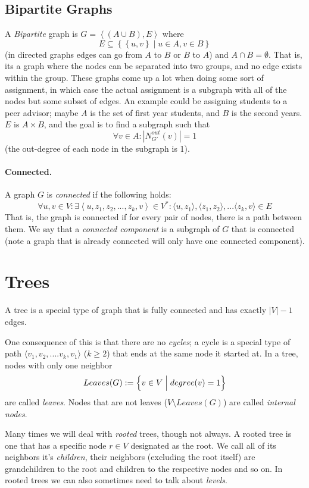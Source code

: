 \subsection{Bipartite Graphs}
A \emph{Bipartite} graph is $G=\left\langle \left(A\cup B\right), E \right\rangle$ 
where \[E\subseteq \left\{\left\{u,v\right\} \mid u\in A, v\in B\right\}\] (in directed graphs edges can go from $A$ to $B$ or $B$ to $A$)
and $A\cap B = \emptyset$. 
That is, its a graph where the nodes can be separated into two groups, and no edge exists within the group.  
These graphs come up a lot when doing some sort of assignment, in which case the actual assignment is a subgraph with all of the nodes but some subset of edges.
An example could be assigning students to a peer advisor; 
maybe $A$ is the set of first year students, and $B$ is the second years. 
$E$ is $A\times B$, and the goal is to find a subgraph such that 
\[\forall v \in A: |N^{out}_{G'}(v)|=1\]
(the out-degree of each node in the subgraph is 1).


\paragraph{Connected.} 
A graph $G$ is \emph{connected} if the following holds:
\[ \forall u,v \in V : \exists \left\langle u,z_1,z_2,...,z_k,v \right\rangle \in V^* : \langle u,z_1 \rangle, \langle z_1,z_2 \rangle, ... \langle z_k,v \rangle \in E  \]
That is, the graph is connected if for every pair of nodes, there is a path between them. 
We say that a \emph{connected component} is a subgraph of $G$ that is connected 
(note a graph that is already connected will only have one connected component). 


\section{Trees}
A tree is a special type of graph that is fully connected and has exactly $|V|-1$ edges. 

One consequence of this is that there are no \emph{cycles};
a cycle is a special type of path $\langle v_1, v_2,.... v_{k}, v_1\rangle$ ($k\ge 2$) that ends at the same node it started at. 
In a tree, nodes with only one neighbor \[Leaves(G) := \Bigl\{v \in V \;\Big|\; degree(v) =1\Bigr\}\] are called \emph{leaves}. 
Nodes that are not leaves ($V\setminus Leaves(G)$)  are called \emph{internal nodes}.

Many times we will deal with \emph{rooted} trees, though not always. 
A rooted tree is one that has a specific node $r\in V$ designated as the root. 
We call all of its neighbors it's \emph{children}, their neighbors (excluding the root itself) are grandchildren to the root and children to the respective nodes and so on. 
In rooted trees we can also sometimes need to talk about \emph{levels}. 


